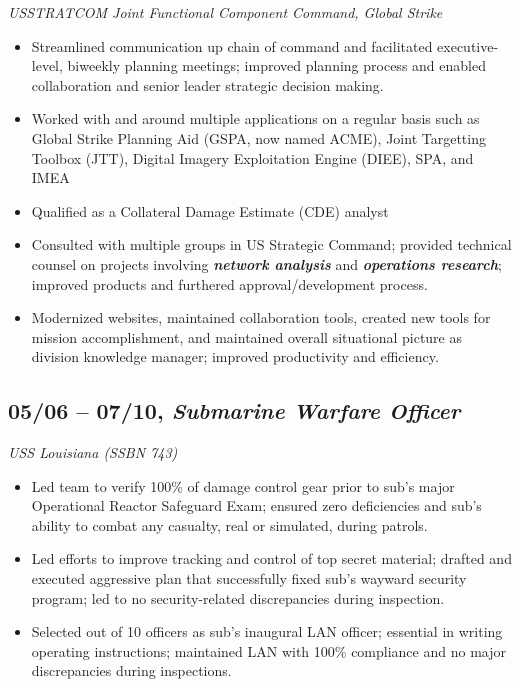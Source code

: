 \documentclass[10pt]{article}
\def\tightlist{}
\begin{document}
\emph{USSTRATCOM Joint Functional Component Command, Global Strike}

\begin{itemize}
\tightlist
\item
  Streamlined communication up chain of command and facilitated
  executive-level, biweekly planning meetings; improved planning process
  and enabled collaboration and senior leader strategic decision making.
\item
  Worked with and around multiple applications on a regular basis such
  as Global Strike Planning Aid (GSPA, now named ACME), Joint Targetting
  Toolbox (JTT), Digital Imagery Exploitation Engine (DIEE), SPA, and
  IMEA
\item
  Qualified as a Collateral Damage Estimate (CDE) analyst
\item
  Consulted with multiple groups in US Strategic Command; provided
  technical counsel on projects involving \textbf{\emph{network
  analysis}} and \textbf{\emph{operations research}}; improved products
  and furthered approval/development process.
\item
  Modernized websites, maintained collaboration tools, created new tools
  for mission accomplishment, and maintained overall situational picture
  as division knowledge manager; improved productivity and efficiency.
\end{itemize}

\subsection{\texorpdfstring{05/06 -- 07/10, \textbf{\emph{Submarine
Warfare
Officer}}}{05/06 -- 07/10, Submarine Warfare Officer}}\label{submarine-warfare-officer}

\emph{USS Louisiana (SSBN 743)}

\begin{itemize}
\tightlist
\item
  Led team to verify 100\% of damage control gear prior to sub's major
  Operational Reactor Safeguard Exam; ensured zero deficiencies and
  sub's ability to combat any casualty, real or simulated, during
  patrols.
\item
  Led efforts to improve tracking and control of top secret material;
  drafted and executed aggressive plan that successfully fixed sub's
  wayward security program; led to no security-related discrepancies
  during inspection.
\item
  Selected out of 10 officers as sub's inaugural LAN officer; essential
  in writing operating instructions; maintained LAN with 100\%
  compliance and no major discrepancies during inspections.
\end{itemize}
\end{document}
